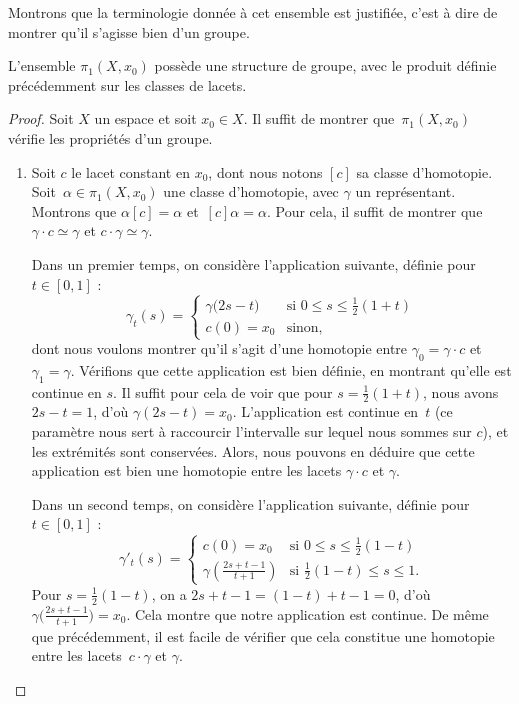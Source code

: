 Montrons que la terminologie donnée à cet ensemble est justifiée, c'est à dire de montrer qu'il s'agisse bien d'un groupe. 

\begin{theorem}
L'ensemble $\pi_1(X,x_0)$ possède une structure de groupe, avec le produit définie précédemment sur les classes de lacets.
\end{theorem}

\begin{proof}
Soit $X$ un espace et soit $x_0\in X$. Il suffit de montrer que~$\pi_1(X,x_0)$ vérifie les propriétés d'un groupe.\begin{enumerate}
    \item Soit $c$ le lacet constant en $x_0$, dont nous notons $[c]$ sa classe d'homotopie. Soit~${\alpha\in\pi_1(X,x_0)}$ une classe d'homotopie, avec $\gamma$ un représentant. Montrons que $\alpha[c]=\alpha$ et~${[c]\alpha=\alpha}$. Pour cela, il suffit de montrer que $\gamma\cdot c\simeq\gamma$ et $c\cdot\gamma\simeq\gamma$.

    Dans un premier temps, on considère l'application suivante, définie pour $t\in[0,1]$ : \[\gamma_t(s)=\left\{\begin{matrix}
    \gamma\big(2s-t\big)&\text{si }0\leq s\leq \frac{1}{2}(1+t)\\ 
    c(0)=x_0&\text{sinon},
    \end{matrix}\right.\]dont nous voulons montrer qu'il s'agit d'une homotopie entre $\gamma_0=\gamma\cdot c$ et $\gamma_1=\gamma$. Vérifions que cette application est bien définie, en montrant qu'elle est continue en $s$. Il suffit pour cela de voir que pour $s=\frac{1}{2}(1+t)$, nous avons $2s-t=1$, d'où $\gamma(2s-t)=x_0$. L'application est continue en~$t$ (ce paramètre nous sert à raccourcir l'intervalle sur lequel nous sommes sur $c$), et les extrémités sont conservées. Alors, nous pouvons en déduire que cette application est bien une homotopie entre les lacets $\gamma\cdot c$ et $\gamma$.

    Dans un second temps, on considère l'application suivante, définie pour $t\in[0,1]$ : \[\gamma'_t(s)=\left\{\begin{matrix}
    c\left(0\right)=x_0&\text{si }0\leq s\leq \frac{1}{2}(1-t)\\ 
    \gamma\left(\frac{2s+t-1}{t+1}\right)&\text{si }\frac{1}{2}(1-t)\leq s\leq 1.
    \end{matrix}\right.\] Pour $s=\frac{1}{2}(1-t)$, on a ${2s+t-1=(1-t)+t-1=0}$, d'où $\gamma\big(\frac{2s+t-1}{t+1}\big)=x_0$. Cela montre que notre application est continue. De même que précédemment, il est facile de vérifier que cela constitue une homotopie entre les lacets~$c\cdot\gamma$ et $\gamma$.


\end{enumerate}
\end{proof}
